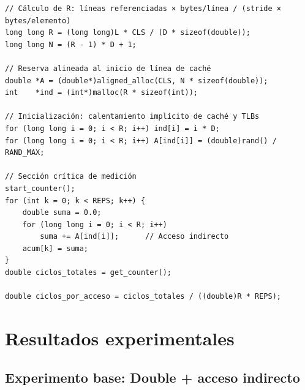 \documentclass[12pt,a4paper]{article}
\begin{document}
\begin{lstlisting}[caption={Fragmento principal de \texttt{acp1.c}: cálculo de R y bucle de medición}, label=lst:acp1]
// Cálculo de R: líneas referenciadas × bytes/línea / (stride × bytes/elemento)
long long R = (long long)L * CLS / (D * sizeof(double));
long long N = (R - 1) * D + 1;

// Reserva alineada al inicio de línea de caché
double *A = (double*)aligned_alloc(CLS, N * sizeof(double));
int    *ind = (int*)malloc(R * sizeof(int));

// Inicialización: calentamiento implícito de caché y TLBs
for (long long i = 0; i < R; i++) ind[i] = i * D;
for (long long i = 0; i < R; i++) A[ind[i]] = (double)rand() / RAND_MAX;

// Sección crítica de medición
start_counter();
for (int k = 0; k < REPS; k++) {
    double suma = 0.0;
    for (long long i = 0; i < R; i++)
        suma += A[ind[i]];      // Acceso indirecto
    acum[k] = suma;
}
double ciclos_totales = get_counter();

double ciclos_por_acceso = ciclos_totales / ((double)R * REPS);
\end{lstlisting}

\section{Resultados experimentales}

\subsection{Experimento base: Double + acceso indirecto}
\end{document}
